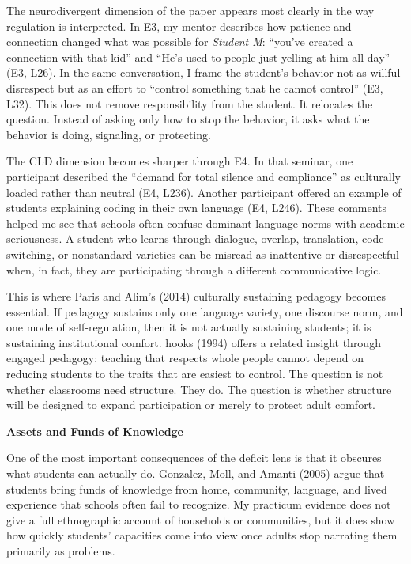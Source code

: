 \documentclass[12pt]{article}
\newcommand{\levelone}[1]{\begin{center}\textbf{#1}\end{center}}
\newcommand{\EvidenceSet}[1]{\textsc{E#1}}
\begin{document}
The neurodivergent dimension of the paper appears most clearly in the way regulation is interpreted. In \EvidenceSet{3}, my mentor describes how patience and connection changed what was possible for \textit{Student M}: ``you've created a connection with that kid'' and ``He's used to people just yelling at him all day'' (\EvidenceSet{3}, L26). In the same conversation, I frame the student's behavior not as willful disrespect but as an effort to ``control something that he cannot control'' (\EvidenceSet{3}, L32). This does not remove responsibility from the student. It relocates the question. Instead of asking only how to stop the behavior, it asks what the behavior is doing, signaling, or protecting.

The CLD dimension becomes sharper through \EvidenceSet{4}. In that seminar, one participant described the ``demand for total silence and compliance'' as culturally loaded rather than neutral (\EvidenceSet{4}, L236). Another participant offered an example of students explaining coding in their own language (\EvidenceSet{4}, L246). These comments helped me see that schools often confuse dominant language norms with academic seriousness. A student who learns through dialogue, overlap, translation, code-switching, or nonstandard varieties can be misread as inattentive or disrespectful when, in fact, they are participating through a different communicative logic.

This is where Paris and Alim's (2014) culturally sustaining pedagogy becomes essential. If pedagogy sustains only one language variety, one discourse norm, and one mode of self-regulation, then it is not actually sustaining students; it is sustaining institutional comfort. hooks (1994) offers a related insight through engaged pedagogy: teaching that respects whole people cannot depend on reducing students to the traits that are easiest to control. The question is not whether classrooms need structure. They do. The question is whether structure will be designed to expand participation or merely to protect adult comfort.

\levelone{Assets and Funds of Knowledge}

One of the most important consequences of the deficit lens is that it obscures what students can actually do. Gonzalez, Moll, and Amanti (2005) argue that students bring funds of knowledge from home, community, language, and lived experience that schools often fail to recognize. My practicum evidence does not give a full ethnographic account of households or communities, but it does show how quickly students' capacities come into view once adults stop narrating them primarily as problems.
\end{document}
